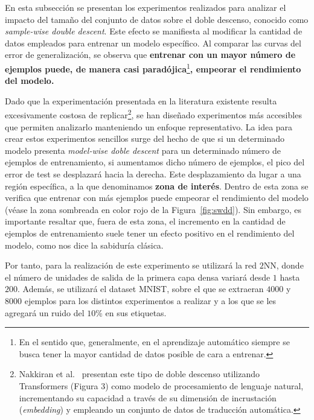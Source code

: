 En esta subsección se presentan los experimentos realizados para analizar el impacto del tamaño del conjunto de datos sobre el doble descenso, conocido como \textit{sample-wise double descent}. Este efecto se manifiesta al modificar la cantidad de datos empleados para entrenar un modelo específico. Al comparar las curvas del error de generalización, se observa que \textbf{entrenar con un mayor número de ejemplos puede, de manera casi paradójica}\footnote{En el sentido que, generalmente, en el aprendizaje automático siempre se busca tener la mayor cantidad de datos posible de cara a entrenar.}\textbf{, empeorar el rendimiento del modelo.}

Dado que la experimentación presentada en la literatura existente resulta excesivamente costosa de replicar\footnote{Nakkiran et al.~\cite{Nakkiran2019} presentan este tipo de doble descenso utilizando Transformers (Figura 3) como modelo de procesamiento de lenguaje natural, incrementando su capacidad a través de su dimensión de incrustación (\textit{embedding}) y empleando un conjunto de datos de traducción automática.}, se han diseñado experimentos más accesibles que permiten analizarlo manteniendo un enfoque representativo. La idea para crear estos experimentos sencillos surge del hecho de que si un determinado modelo presenta \textit{model-wise doble descent} para un determinado número de ejemplos de entrenamiento, si aumentamos dicho número de ejemplos, el pico del error de test se desplazará hacia la derecha. Este desplazamiento da lugar a una región específica, a la que denominamos \textbf{zona de interés}. Dentro de esta zona se verifica que entrenar con más ejemplos puede empeorar el rendimiento del modelo (véase la zona sombreada en color rojo de la Figura~\ref{fig:swdd}). Sin embargo, es importante resaltar que, fuera de esta zona, el incremento en la cantidad de ejemplos de entrenamiento suele tener un efecto positivo en el rendimiento del modelo, como nos dice la sabiduría clásica.

Por tanto, para la realización de este experimento se utilizará la red $2$NN, donde el número de unidades de salida de la primera capa densa variará desde $1$ hasta $200$. Además, se utilizará el dataset MNIST, sobre el que se extraeran $4000$ y $8000$ ejemplos para los distintos experimentos a realizar y a los que se les agregará un ruido del $10$\% en sus etiquetas.

